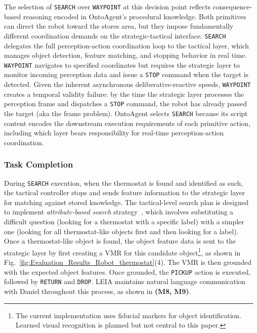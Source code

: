 \documentclass[letterpaper, 10 pt, conference]{ieeeconf}  %
\begin{document}
 The selection of \texttt{SEARCH} over \texttt{WAYPOINT} at this decision point reflects consequence-based reasoning encoded in OntoAgent's procedural knowledge. Both primitives can direct the robot toward the stores area, but they impose fundamentally different coordination demands on the strategic-tactical interface. \texttt{SEARCH} delegates the full perception-action coordination loop to the tactical layer, which manages object detection, feature matching, and stopping behavior in real time. \texttt{WAYPOINT} navigates to specified coordinates but requires the strategic layer to monitor incoming perception data and issue a \texttt{STOP} command when the target is detected. Given the inherent asynchronous deliberative-reactive speeds, \texttt{WAYPOINT} creates a temporal validity failure: by the time the strategic layer processes the perception frame and dispatches a \texttt{STOP} command, the robot has already passed the target (aka the frame problem). OntoAgent selects \texttt{SEARCH} because its script content encodes the downstream execution requirements of each primitive action, including which layer bears responsibility for real-time perception-action coordination.

\subsubsection{Task Completion} During \texttt{SEARCH} execution, when the thermostat is found and identified as such, the tactical controller stops and sends feature information to the strategic layer for matching against stored knowledge. The tactical-level search plan is designed to implement \textit{attribute-based search} strategy~\cite{kahneman2011thinking}, which involves substituting a difficult question (looking for a thermostat with a specific label) with a simpler one (looking for all thermostat-like objects first and then looking for a label). Once a thermostat-like object is found, the object feature data is sent to the strategic layer by first creating a VMR for this candidate object\footnote{The current implementation uses fiducial markers for object identification. Learned visual recognition is planned but not central to this paper.}, as shown in Fig.~\ref{fig:Evaluation_Results_Robot_thermostat}(4). The VMR is then grounded with the expected object features. Once grounded, the \texttt{PICKUP} action is executed, followed by \texttt{RETURN} and \texttt{DROP}.  LEIA  maintains natural language communication with Daniel throughout this process, as shown in \textbf{(M8, M9)}.
\end{document}
